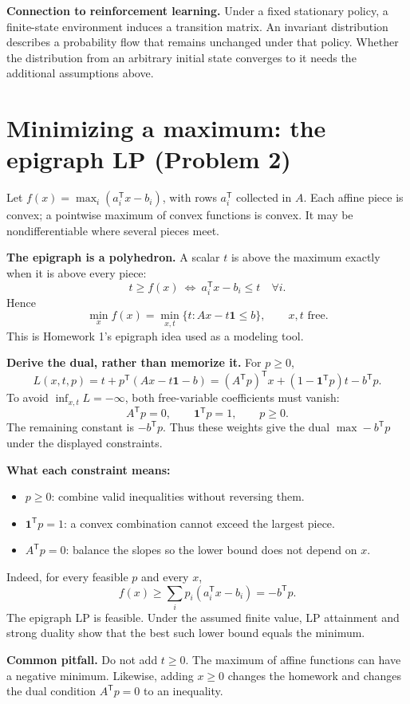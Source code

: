 \documentclass[11pt]{article}
\newenvironment{pitfall}{\begingroup\colorlet{shadecolor}{warncolor}\begin{shaded}\noindent\textbf{Common pitfall.} }{\end{shaded}\endgroup}
\newcommand{\T}{^{\mathsf T}}
\newcommand{\ones}{\mathbf 1}
\begin{document}
\textbf{Connection to reinforcement learning.} Under a fixed stationary
policy, a finite-state environment induces a transition matrix. An invariant
distribution describes a probability flow that remains unchanged under
that policy. Whether the distribution from an arbitrary initial state
converges to it needs the additional assumptions above.

\newpage
\section{Minimizing a maximum: the epigraph LP (Problem 2)}
Let $f(x)=\max_i(a_i\T x-b_i)$, with rows $a_i\T$ collected in $A$.
Each affine piece is convex; a pointwise maximum of convex functions
is convex. It may be nondifferentiable where several pieces meet.

\textbf{The epigraph is a polyhedron.} A scalar $t$ is above the maximum
exactly when it is above every piece:
\[
t\ge f(x)\ \Longleftrightarrow\ a_i\T x-b_i\le t\quad\forall i.
\]
Hence
\[
\min_xf(x)=\min_{x,t}\{t:Ax-t\ones\le b\},\qquad x,t\text{ free}.
\]
This is Homework 1's epigraph idea used as a modeling tool.

\textbf{Derive the dual, rather than memorize it.}
For $p\ge0$,
\[
L(x,t,p)=t+p\T(Ax-t\ones-b)
=(A\T p)\T x+(1-\ones\T p)t-b\T p.
\]
To avoid $\inf_{x,t}L=-\infty$, both free-variable coefficients must vanish:
\[
\boxed{A\T p=0,\qquad\ones\T p=1,\qquad p\ge0.}
\]
The remaining constant is $-b\T p$. Thus these weights give the dual
$\max -b\T p$ under the displayed constraints.

\textbf{What each constraint means:}
\begin{itemize}
\item $p\ge0$: combine valid inequalities without reversing them.
\item $\ones\T p=1$: a convex combination cannot exceed the largest piece.
\item $A\T p=0$: balance the slopes so the lower bound does not depend on $x$.
\end{itemize}
Indeed, for every feasible $p$ and every $x$,
\[
f(x)\ge\sum_i p_i(a_i\T x-b_i)=-b\T p.
\]
The epigraph LP is feasible. Under the assumed finite value, LP attainment
and strong duality show that the best such lower bound equals the minimum.

\begin{pitfall}
Do not add $t\ge0$. The maximum of affine functions can have a negative
minimum. Likewise, adding $x\ge0$ changes the homework and changes the
dual condition $A\T p=0$ to an inequality.
\end{pitfall}
\end{document}
